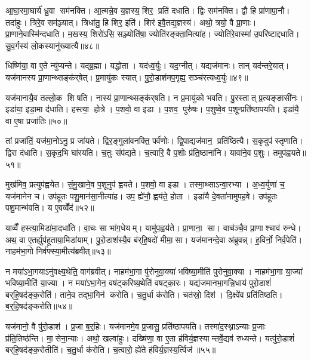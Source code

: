 आ॒घा॒रमा॒घार्य॑ ध्रु॒वा सम॑नक्ति। आ॒त्मन्ने॒व य॒ज्ञस्य॒ शिर॒ प्रति॑ दधाति। द्विः सम॑नक्ति। द्वौ हि प्रा॑णापा॒नौ। तदा॑हुः। त्रिरे॒व सम॑ञ्ज्यात्। त्रिधा॑तु॒ हि शिर॒ इति॑। शिर॑ इवै॒तद्य॒ज्ञस्य॑। अथो॒ त्रयो॒ वै प्रा॒णाः। प्रा॒णाने॒वास्मि॑न्दधाति। म॒खस्य॒ शिरो॑ऽसि॒ सञ्ज्योति॑षा॒ ज्योति॑रङ्क्ता॒मित्या॑ह। ज्योति॑रे॒वास्मा॑ उ॒परि॑ष्टाद्दधाति। सु॒व॒र्गस्य॑ लो॒कस्यानु॑ख्यात्यै॥४८॥\anuvakamend[परि॑दधाति प्रा॒णन्द॑धाति॒ हि य॒ज्ञो घा॑रयति॒ नम॒ इत्या॑ह प॒श्चाद्वी॒र्या॑णीत्या॑ह॒ भा इत्या॑ह भ॒जेत्या॑ह ध्रु॒वैवास्मि॑न्दधाति॒ त्रीणि॑ च]

धिष्णि॑या॒ वा ए॒ते न्यु॑प्यन्ते। यद्ब्र॒ह्मा। यद्धोता। यद॑ध्व॒र्युः। यद॒ग्नीत्। यद्यज॑मानः। तान् यद॑न्तरे॒यात्। यज॑मानस्य प्रा॒णान्थ्सङ्क॑र्‌षेत्। प्र॒मायु॑कः स्यात्। पु॒रो॒डाश॑मप॒गृह्य॒ सञ्च॑रत्यध्व॒र्युः॥४९॥

यज॑मानायै॒व तल्लो॒क शिषति। नास्य॑ प्रा॒णान्थ्सङ्क॑र्‌षति। न प्र॒मायु॑को भवति। पु॒रस्तात् प्र॒त्यङ्ङासी॑नः। इडा॑या॒ इडा॒मा द॑धाति। हस्त्या॒ होत्रे। प॒शवो॒ वा इडा। प॒शव॒ पुरु॑षः। प॒शुष्वे॒व प॒शून्प्रति॑ष्ठापयति। इडा॑यै॒ वा ए॒षा प्रजा॑तिः॥५०॥

तां प्रजा॑तिं॒ यज॑मा॒नोऽनु॒ प्र जा॑यते। द्विर॒ङ्गुला॑वनक्ति॒ पर्व॑णोः। द्वि॒पाद्यज॑मान॒ प्रति॑ष्ठित्यै। स॒कृदुप॑ स्तृणाति। द्विरा द॑धाति। स॒कृद॒भि घा॑रयति। च॒तुः संप॑द्यते। च॒त्वारि॒ वै प॒शोः प्र॑ति॒ष्ठाना॑नि। यावा॑ने॒व प॒शुः। तमुप॑ह्वयते॥५१॥

मुख॑मिव॒ प्रत्युप॑ह्वयेत। सं॒मु॒खाने॒व प॒शूनुप॑ ह्वयते। प॒शवो॒ वा इडा। तस्मा॒थ्साऽन्वा॒रभ्या। अ॒ध्व॒र्युणा॑ च॒ यज॑मानेन च। उप॑हूतः पशु॒मान॑सा॒नीत्या॑ह। उप॒ ह्ये॑नौ॒ ह्वय॑ते॒ होता। इडा॑यै दे॒वता॑नामुपह॒वे। उप॑हूतः पशु॒मान्भ॑वति। य ए॒वव्वेँद॑॥५२॥

याव्वैँ हस्त्या॒मिडा॑मा॒दधा॑ति। वा॒चः सा भा॑ग॒धेयम्। यामु॑प॒ह्वय॑ते। प्रा॒णाना॒ सा। वाच॑ञ्चै॒व प्रा॒णाश्चाव॑ रुन्धे। अथ॒ वा ए॒तर्ह्युप॑हूताया॒मिडा॑याम्। पु॒रो॒डाश॑स्यै॒व ब॑र्‌हि॒षदो॑ मीमा॒सा। यज॑मानन्दे॒वा अ॑ब्रुवन्न्। ह॒विर्नो॒ निर्व॒पेति॑। नाहम॑भा॒गो निर्व॑फ्स्या॒मीत्य॑ब्रवीत्॥५३॥

न मया॑ऽभा॒गयाऽनु॑वक्ष्य॒थेति॒ वाग॑ब्रवीत्। नाहम॑भा॒गा पु॑रोनुवा॒क्या॑ भविष्या॒मीति॑ पुरोनुवा॒क्या। नाहम॑भा॒गा या॒ज्या॑ भविष्या॒मीति॑ या॒ज्या। न मया॑ऽभा॒गेन॒ वष॑ट्करिष्य॒थेति॑ वषट्का॒रः। यद्य॑जमानभा॒गन्नि॒धाय॑ पुरो॒डाशं॑ बर्‌हि॒षद॑ङ्क॒रोति॑। ताने॒व तद्भा॒गिन॑ करोति। च॒तु॒र्धा क॑रोति। चत॑स्रो॒ दिश॑। दि॒क्ष्वे॑व प्रति॑तिष्ठति। ब॒र्॒हि॒षद॑ङ्करोति॥५४॥

यज॑मानो॒ वै पु॑रो॒डाश॑। प्र॒जा ब॒र्॒हिः। यज॑मानमे॒व प्र॒जासु॒ प्रति॑ष्ठापयति। तस्मा॑द॒स्थ्नाऽन्याः प्र॒जाः प्र॑ति॒तिष्ठ॑न्ति। मा॒सेना॒न्याः। अथो॒ खल्वा॑हुः। दख्षि॑णा॒ वा ए॒ता ह॑विर्य॒ज्ञस्यान्तर्वे॒द्यव॑ रुध्यन्ते। यत्पु॑रो॒डाशं॑ बर्‌हि॒षद॑ङ्क॒रोतीति॑। च॒तु॒र्धा क॑रोति। च॒त्वारो॒ ह्ये॑ते ह॑विर्य॒ज्ञस्य॒र्त्विज॑॥५५॥

